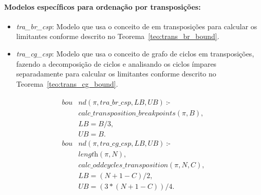 \paragraph{Modelos específicos para ordenação por transposições:}
\begin{itemize}

    \item{\textit{tra\_br\_csp}: Modelo que usa o conceito de \bkp{} em
        transposições para calcular os limitantes conforme descrito no
        Teorema~\ref{teo:trans_br_bound}.}

    \item{\textit{tra\_cg\_csp}: Modelo que usa o conceito de grafo de
        ciclos em transposições, fazendo a decomposição de ciclos e
        analisando os ciclos ímpares separadamente para calcular os
        limitantes conforme descrito no
        Teorema~\ref{teo:trans_cg_bound}.}

\end{itemize}
\begin{align}
  \label{bound_tra}
  \begin{split}
  \textit{bou}&\textit{nd}(\pi, tra\_br\_csp, LB, UB)~\text{:-} \\
  &\textit{calc\_transposition\_breakpoints}(\pi, B), \\
  &LB = B / 3,  \\ %
  &UB = B.   \\
  \textit{bou}&\textit{nd}(\pi, tra\_cg\_csp, LB, UB)~\text{:-} \\
  &\textit{length}(\pi, N), \\
  &\textit{calc\_oddcycles\_transposition}(\pi, N, C), \\
  &LB = (N + 1 - C) / 2, \\ 
  &UB = (3 * (N + 1 - C)) / 4.
  \end{split}
\end{align}

